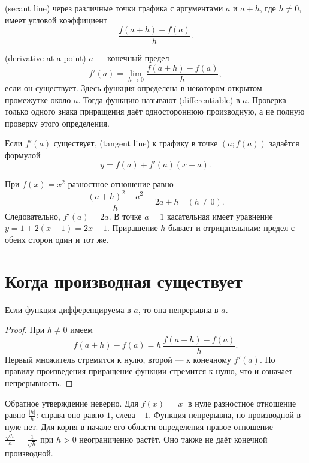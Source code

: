 \begin{definition}
 (secant line) через различные точки графика с аргументами \(a\) и \(a+h\), где \(h\ne0\), имеет угловой коэффициент
\[
\frac{f(a+h)-f(a)}h.
\]
\end{definition}

\begin{definition}
 (derivative at a point) \(a\) --- конечный предел
\[
f'(a)=\lim_{h\to0}\frac{f(a+h)-f(a)}h,
\]
если он существует. Здесь функция определена в некотором открытом промежутке около \(a\). Тогда функцию называют  (differentiable) в \(a\). Проверка только одного знака приращения даёт одностороннюю производную, а не полную проверку этого определения.
\end{definition}

\begin{definition}
Если \(f'(a)\) существует,  (tangent line) к графику в точке \((a;f(a))\) задаётся формулой
\[
y=f(a)+f'(a)(x-a).
\]
\end{definition}

\begin{example}
При \(f(x)=x^2\) разностное отношение равно
\[
\frac{(a+h)^2-a^2}{h}=2a+h\quad(h\ne0).
\]
Следовательно, \(f'(a)=2a\). В точке \(a=1\) касательная имеет уравнение \(y=1+2(x-1)=2x-1\). Приращение \(h\) бывает и отрицательным: предел с обеих сторон один и тот же.
\end{example}

\section{Когда производная существует}

\begin{theorem}\label{thm:legacy-c20-1}
Если функция дифференцируема в \(a\), то она непрерывна в \(a\).
\end{theorem}
\begin{proof}
При \(h\ne0\) имеем
\[
f(a+h)-f(a)=h\,\frac{f(a+h)-f(a)}h.
\]
Первый множитель стремится к нулю, второй --- к конечному \(f'(a)\). По правилу произведения приращение функции стремится к нулю, что и означает непрерывность.
\end{proof}

Обратное утверждение неверно. Для \(f(x)=|x|\) в нуле разностное отношение равно \(\frac{|h|}{h}\): справа оно равно \(1\), слева \(-1\). Функция непрерывна, но производной в нуле нет. Для корня в начале его области определения правое отношение \(\frac{\sqrt h}{h}=\frac1{\sqrt h}\) при \(h>0\) неограниченно растёт. Оно также не даёт конечной производной.

